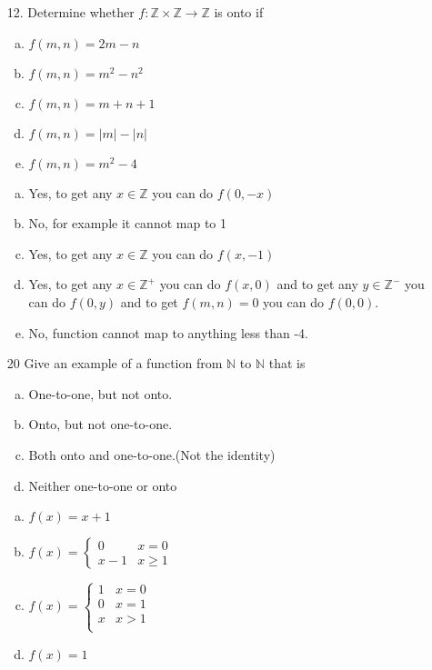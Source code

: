 \begin{itemize}
   \item[12.]Determine whether $f : \mathbb{Z} \times \mathbb{Z} \to \mathbb{Z}$ is onto if
         \begin{enumerate}[a.]
            \item $f(m,n) = 2m - n$
            \item $f(m,n) = m^2 - n^2$
            \item $f(m,n) = m + n + 1$
            \item $f(m,n) = \lvert m \rvert - \lvert n \rvert$
            \item $f(m,n) = m^2 - 4$
         \end{enumerate}
         \answer
         \begin{enumerate}[a.]
            \item Yes, to get any $x \in \mathbb{Z}$ you can do $f(0, -x)$
            \item No, for example it cannot map to 1
            \item Yes, to get any $x \in \mathbb{Z}$ you can do $f(x, -1)$
            \item Yes, to get any $x \in \mathbb{Z}^+$ you can do $f(x, 0)$ and to get any $y \in \mathbb{Z}^-$ you can do $f(0, y)$ and to get $f(m,n) = 0$ you can do $f(0, 0)$.
            \item No, function cannot map to anything less than -4.
         \end{enumerate}

   \item[20] Give an example of a function from $\mathbb{N}$ to $\mathbb{N}$ that is
         \begin{enumerate}[a.]
            \item One-to-one, but not onto.
            \item Onto, but not one-to-one.
            \item Both onto and one-to-one.(Not the identity)
            \item Neither one-to-one or onto
         \end{enumerate}
         \answer
         \begin{enumerate}[a.]
            \item $f(x) = x+1$
            \item $f(x) = \begin{cases}
                        0     & x = 0    \\
                        x - 1 & x \geq 1
                     \end{cases}$
            \item $f(x) = \begin{cases}
                        1 & x = 0 \\
                        0 & x = 1 \\
                        x & x > 1 \\
                     \end{cases}$
            \item $f(x) = 1$
         \end{enumerate}
\end{itemize}

